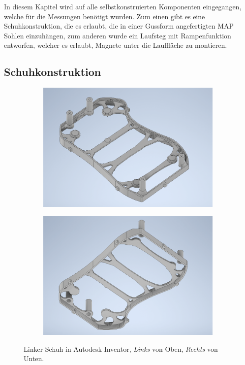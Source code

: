 In diesem Kapitel wird auf alle selbstkonstruierten Komponenten eingegangen, welche für die Messungen benötigt wurden. Zum einen gibt es eine Schuhkonstruktion, die es erlaubt, die in einer Gussform angefertigten MAP Sohlen einzuhängen, zum anderen wurde ein Laufsteg mit Rampenfunktion entworfen, welcher es erlaubt, Magnete unter die Lauffläche zu montieren. 

\subsection{Schuhkonstruktion} \label{Schuhkonstruktion}
\begin{figure}[tb]
	\hfill
	\begin{subfigure}[c]{.49\linewidth}
		\centering
		\includegraphics[width=\linewidth]{Bilder/Schuh_oben.png}
	\end{subfigure}
	\begin{subfigure}[c]{.49\linewidth}
		\centering
		\includegraphics[width=\linewidth]{Bilder/Schuh_unten.png}
	\end{subfigure}
	\hfill
	\caption{Linker Schuh in Autodesk Inventor, \textit{Links} von Oben, \textit{Rechts} von Unten.}
	\label{Schuh_Inventor}
\end{figure}

